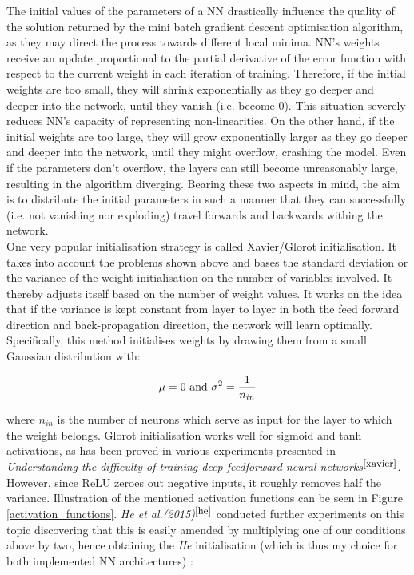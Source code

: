 The initial values of the parameters of a NN drastically influence the quality of the solution returned by the mini batch gradient descent optimisation algorithm, as they may direct the process towards different local minima. NN's weights receive an update proportional to the partial derivative of the error function with respect to the current weight in each iteration of training. Therefore, if the initial weights are too small, they will shrink exponentially as they go deeper and deeper into the network, until they vanish (i.e. become 0). This situation severely reduces NN's capacity of representing non-linearities. On the other hand, if the initial weights are too large, they will grow exponentially larger as they go deeper and deeper into the network, until they might overflow, crashing the model. Even if the parameters don't overflow, the layers can still become unreasonably large, resulting in the algorithm diverging. Bearing these two aspects in mind, the aim is to distribute the initial parameters in such a manner that they can successfully (i.e. not vanishing nor exploding) travel forwards and backwards withing the network. \\

One very popular initialisation strategy is called Xavier/Glorot initialisation. It takes into account the problems shown above and bases the standard deviation or the variance of the weight initialisation on the number of variables involved. It thereby adjusts itself based on the number of weight values. It works on the idea that if the variance is kept constant from layer to layer in both the feed forward direction and back-propagation direction, the network will learn optimally. Specifically, this method initialises weights by drawing them from a small Gaussian distribution with: 

\begin{equation}
  \centering
  \mu = 0 \ \text{and} \ \sigma^2 = \frac{1}{n_{in}}
\end{equation}

where $n_{in}$ is the number of neurons which serve as input for the layer to which the weight belongs.
Glorot initialisation works well for sigmoid and tanh activations, as has been proved in various experiments presented in \textit{Understanding the difficulty of training deep feedforward neural networks}$^{\small \cite{xavier}}$. However, since ReLU zeroes out negative inputs, it roughly removes half the variance. Illustration of the mentioned activation functions can be seen in Figure \ref{activation_functions}. \textit{He et al.(2015)}$^{\small \cite{he}}$ conducted further experiments on this topic discovering that this is easily amended by multiplying one of our conditions above by two, hence obtaining the \textit{He} initialisation (which is thus my choice for both implemented NN architectures) :

